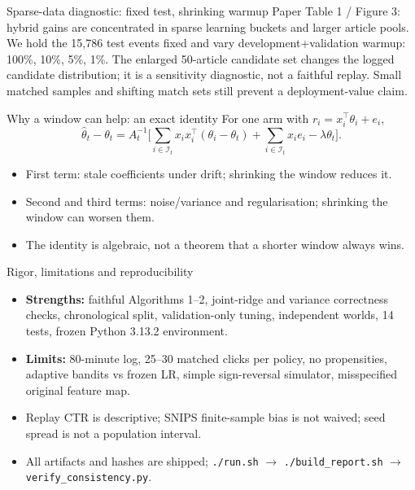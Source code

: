 \documentclass[10pt,aspectratio=169]{beamer}
\begin{document}
\begin{frame}{Sparse-data diagnostic: fixed test, shrinking warmup}
Paper Table 1 / Figure 3: hybrid gains are concentrated in sparse learning buckets and larger article pools. We hold the 15,786 test events fixed and vary development+validation warmup: 100\%, 10\%, 5\%, 1\%.
\SparseSummary
\vspace{3pt}
The enlarged 50-article candidate set changes the logged candidate distribution; it is a sensitivity diagnostic, not a faithful replay. Small matched samples and shifting match sets still prevent a deployment-value claim.
\end{frame}

\begin{frame}{Why a window can help: an exact identity}
For one arm with $r_i=x_i^\top\theta_i+e_i$,
\[
\hat\theta_t-\theta_t=A_t^{-1}\Big[
\sum_{i\in\mathcal I_t}x_ix_i^\top(\theta_i-\theta_t)
+\sum_{i\in\mathcal I_t}x_ie_i-\lambda\theta_t\Big].
\]
\begin{itemize}
\item First term: stale coefficients under drift; shrinking the window reduces it.
\item Second and third terms: noise/variance and regularisation; shrinking the window can worsen them.
\item The identity is algebraic, not a theorem that a shorter window always wins.
\end{itemize}
\end{frame}

\begin{frame}{Rigor, limitations and reproducibility}
\begin{itemize}
\item \textbf{Strengths:} faithful Algorithms 1--2, joint-ridge and variance correctness checks, chronological split, validation-only tuning, independent worlds, 14 tests, frozen Python 3.13.2 environment.
\item \textbf{Limits:} 80-minute log, 25--30 matched clicks per policy, no propensities, adaptive bandits vs frozen LR, simple sign-reversal simulator, misspecified original feature map.
\item Replay CTR is descriptive; SNIPS finite-sample bias is not waived; seed spread is not a population interval.
\item All artifacts and hashes are shipped; \texttt{./run.sh} $\to$ \texttt{./build\_report.sh} $\to$ \texttt{verify\_consistency.py}.
\end{itemize}
\end{frame}
\end{document}
